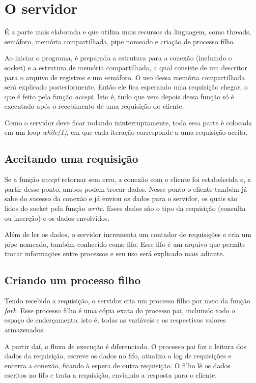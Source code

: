\documentclass[12pt]{article}
\begin{document}
\section{O servidor}

É a parte mais elaborada e que utiliza mais recursos da linguagem, como threads, semáforo, memória compartilhada, pipe nomeado e criação de processo filho.

Ao iniciar o programa, é preparada a estrutura para a conexão (incluindo o socket) e a estrutura de memória compartilhada, a qual consiste de um descritor para o arquivo de registros e um semáforo. O uso dessa memória compartilhada será explicado posteriormente. Então ele fica esperando uma requisição chegar, o que é feito pela função \emph{accept}. Isto é, tudo que vem depois dessa função só é executado após o recebimento de uma requisição do cliente.

Como o servidor deve ficar rodando ininterruptamente, toda essa parte é colocada em um loop \emph{while(1)}, em que cada iteração corresponde a uma requisição aceita.

\subsection{Aceitando uma requisição}

Se a função \emph{accept} retornar sem erro, a conexão com o cliente foi estabelecida e, a partir desse ponto, ambos podem trocar dados. Nesse ponto o cliente também já sabe do sucesso da conexão e já enviou os dados para o servidor, os quais são lidos do socket pela função \emph{write}. Esses dados são o tipo da requisição (consulta ou inserção) e os dados envolvidos.

Além de ler os dados, o servidor incrementa um contador de requisições e cria um pipe nomeado, também conhecido como fifo. Esse fifo é um arquivo que permite trocar informações entre processos e seu uso será explicado mais adiante.

\subsection{Criando um processo filho}

Tendo recebido a requisição, o servidor cria um processo filho por meio da função \emph{fork}. Esse processo filho é uma cópia exata do processo pai, incluindo todo o espaço de enderçamento, isto é, todas as variáveis e os respectivos valores armazenados. 

A partir daí, o fluxo de execução é diferenciado. O processo pai faz a leitura dos dados da requisição, escreve os dados no fifo, atualiza o log de requisições e encerra a conexão, ficando à espera de outra requisição. O filho lê os dados escritos no fifo e trata a requisição, enviando a resposta para o cliente.
\end{document}
